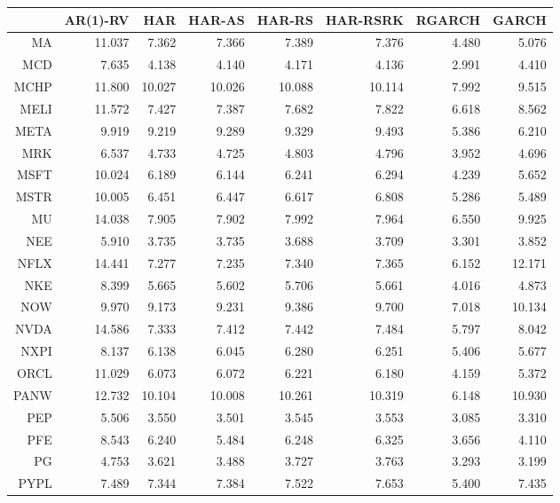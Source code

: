 \begin{table}[ht]
\centering
\begin{tabular}{rrrrrrrr}
  \hline
 & AR(1)-RV & HAR & HAR-AS & HAR-RS & HAR-RSRK & RGARCH & GARCH \\ 
  \hline
MA & 11.037 & 7.362 & 7.366 & 7.389 & 7.376 & 4.480 & 5.076 \\ 
  MCD & 7.635 & 4.138 & 4.140 & 4.171 & 4.136 & 2.991 & 4.410 \\ 
  MCHP & 11.800 & 10.027 & 10.026 & 10.088 & 10.114 & 7.992 & 9.515 \\ 
  MELI & 11.572 & 7.427 & 7.387 & 7.682 & 7.822 & 6.618 & 8.562 \\ 
  META & 9.919 & 9.219 & 9.289 & 9.329 & 9.493 & 5.386 & 6.210 \\ 
  MRK & 6.537 & 4.733 & 4.725 & 4.803 & 4.796 & 3.952 & 4.696 \\ 
  MSFT & 10.024 & 6.189 & 6.144 & 6.241 & 6.294 & 4.239 & 5.652 \\ 
  MSTR & 10.005 & 6.451 & 6.447 & 6.617 & 6.808 & 5.286 & 5.489 \\ 
  MU & 14.038 & 7.905 & 7.902 & 7.992 & 7.964 & 6.550 & 9.925 \\ 
  NEE & 5.910 & 3.735 & 3.735 & 3.688 & 3.709 & 3.301 & 3.852 \\ 
  NFLX & 14.441 & 7.277 & 7.235 & 7.340 & 7.365 & 6.152 & 12.171 \\ 
  NKE & 8.399 & 5.665 & 5.602 & 5.706 & 5.661 & 4.016 & 4.873 \\ 
  NOW & 9.970 & 9.173 & 9.231 & 9.386 & 9.700 & 7.018 & 10.134 \\ 
  NVDA & 14.586 & 7.333 & 7.412 & 7.442 & 7.484 & 5.797 & 8.042 \\ 
  NXPI & 8.137 & 6.138 & 6.045 & 6.280 & 6.251 & 5.406 & 5.677 \\ 
  ORCL & 11.029 & 6.073 & 6.072 & 6.221 & 6.180 & 4.159 & 5.372 \\ 
  PANW & 12.732 & 10.104 & 10.008 & 10.261 & 10.319 & 6.148 & 10.930 \\ 
  PEP & 5.506 & 3.550 & 3.501 & 3.545 & 3.553 & 3.085 & 3.310 \\ 
  PFE & 8.543 & 6.240 & 5.484 & 6.248 & 6.325 & 3.656 & 4.110 \\ 
  PG & 4.753 & 3.621 & 3.488 & 3.727 & 3.763 & 3.293 & 3.199 \\ 
  PYPL & 7.489 & 7.344 & 7.384 & 7.522 & 7.653 & 5.400 & 7.435 \\ 

\end{tabular}
\end{table}
